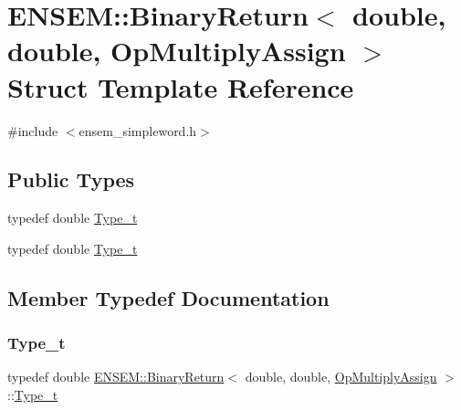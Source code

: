 \hypertarget{structENSEM_1_1BinaryReturn_3_01double_00_01double_00_01OpMultiplyAssign_01_4}{}\section{E\+N\+S\+EM\+:\+:Binary\+Return$<$ double, double, Op\+Multiply\+Assign $>$ Struct Template Reference}
\label{structENSEM_1_1BinaryReturn_3_01double_00_01double_00_01OpMultiplyAssign_01_4}


{\ttfamily \#include $<$ensem\+\_\+simpleword.\+h$>$}

\subsection*{Public Types}
\begin{DoxyCompactItemize}
\item 
typedef double \mbox{\hyperlink{structENSEM_1_1BinaryReturn_3_01double_00_01double_00_01OpMultiplyAssign_01_4_a68d7326bd6a61910b02ec674e3a92f01}{Type\+\_\+t}}
\item 
typedef double \mbox{\hyperlink{structENSEM_1_1BinaryReturn_3_01double_00_01double_00_01OpMultiplyAssign_01_4_a68d7326bd6a61910b02ec674e3a92f01}{Type\+\_\+t}}
\end{DoxyCompactItemize}


\subsection{Member Typedef Documentation}
\mbox{\label{structENSEM_1_1BinaryReturn_3_01double_00_01double_00_01OpMultiplyAssign_01_4_a68d7326bd6a61910b02ec674e3a92f01}} 
\subsubsection{\texorpdfstring{Type\_t}{Type\_t}\hspace{0.1cm}{\footnotesize\ttfamily [1/2]}}
{\footnotesize\ttfamily typedef double \mbox{\hyperlink{structENSEM_1_1BinaryReturn}{E\+N\+S\+E\+M\+::\+Binary\+Return}}$<$ double, double, \mbox{\hyperlink{structENSEM_1_1OpMultiplyAssign}{Op\+Multiply\+Assign}} $>$\+::\mbox{\hyperlink{structENSEM_1_1BinaryReturn_3_01double_00_01double_00_01OpMultiplyAssign_01_4_a68d7326bd6a61910b02ec674e3a92f01}{Type\+\_\+t}}}

